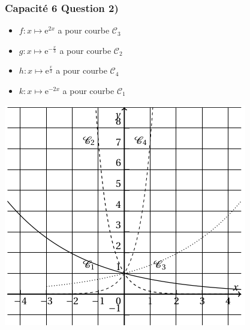 \documentclass[11pt, hyperref={urlcolor=red,%
            linkcolor=blue, %
            colorlinks=true}]{beamer}
\begin{document}
\begin{frame}
\frametitle{Capacité 6 Question 2)}


	\begin{itemize}
		\item $f:x \mapsto \text{e}^{2x}$ a pour courbe  $\mathcal{C}_{3}$
		\item $g:x \mapsto \text{e}^{-\frac{x}{3}}$ a pour courbe $\mathcal{C}_{2}$
		\item $h:x \mapsto \text{e}^{\frac{x}{3}}$ a pour courbe $\mathcal{C}_{4}$
		\item $k:x \mapsto \text{e}^{-2x}$ a pour courbe $\mathcal{C}_{1}$
	\end{itemize}

\begin{center}
\includegraphics[scale=0.3]{capacite6bisbis.png}
\end{center}


\end{frame}







	
	
\end{document}
